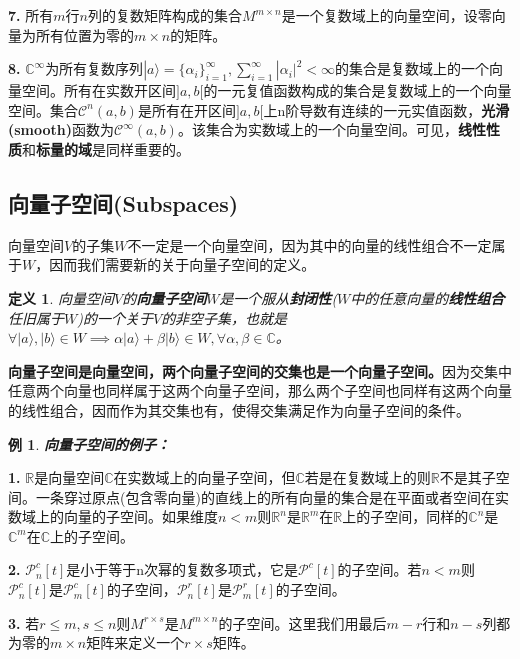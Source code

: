\documentclass[mathserif,hyperref,UTF8,openany,b5paper]{ctexbook}
\newtheorem{exmp}{例}[section]
\newtheorem{defn}{定义}[section]
\begin{document}
\textbf{7.}
所有$m$行$n$列的复数矩阵构成的集合$M^{m\times n}$是一个复数域上的向量空间，设零向量为所有位置为零的$m\times n$的矩阵。

\textbf{8.}
$\mathbb{C}^\infty$为所有复数序列$|a\rangle=\{\alpha_i\}^\infty_{i=1},\sum^\infty_{i=1}|\alpha_i|^2 < \infty$的集合是复数域上的一个向量空间。所有在实数开区间$]a,b[$的一元复值函数构成的集合是复数域上的一个向量空间。集合$\mathcal{C}^n(a,b)$是所有在开区间$]a,b[$上n阶导数有连续的一元实值函数，\textbf{光滑(smooth)}函数为$\mathcal{C}^\infty(a,b)$。该集合为实数域上的一个向量空间。可见，\textbf{线性性质}和\textbf{标量的域}是同样重要的。
\subsection{向量子空间(Subspaces)}
向量空间$V$的子集$W$不一定是一个向量空间，因为其中的向量的线性组合不一定属于$W$，因而我们需要新的关于向量子空间的定义。
\begin{defn}
向量空间$V$的\textbf{向量子空间}$W$是一个服从\textbf{封闭性}($W$中的任意向量的\textbf{线性组合}任旧属于$W$)的一个关于$V$的非空子集，也就是
$\forall |a\rangle,|b\rangle \in W \implies \alpha|a\rangle+\beta|b\rangle \in W, \forall \alpha,\beta\in \mathbb{C}$。
\end{defn}

\textbf{向量子空间是向量空间，两个向量子空间的交集也是一个向量子空间。}因为交集中任意两个向量也同样属于这两个向量子空间，那么两个子空间也同样有这两个向量的线性组合，因而作为其交集也有，使得交集满足作为向量子空间的条件。

\begin{exmp}\textbf{向量子空间的例子：}\end{exmp}

\textbf{1.} $\mathbb{R}$是向量空间$\mathbb{C}$在实数域上的向量子空间，但$\mathbb{C}$若是在复数域上的则$\mathbb{R}$不是其子空间。一条穿过原点(包含零向量)的直线上的所有向量的集合是在平面或者空间在实数域上的向量的子空间。如果维度$n<m$则$\mathbb{R}^n$是$\mathbb{R}^m$在$\mathbb{R}$上的子空间，同样的$\mathbb{C}^n$是$\mathbb{C}^m$在$\mathbb{C}$上的子空间。

 \textbf{2.} $\mathcal{P}^c_n [t]$是小于等于n次幂的复数多项式，它是$\mathcal{P}^c [t]$的子空间。若$n<m$则$\mathcal{P}^c_n [t]$是$\mathcal{P}^c _m[t]$的子空间，$\mathcal{P}^r_n [t]$是$\mathcal{P}^r_m [t]$的子空间。

 \textbf{3.} 若$r\leq m,s\leq n$则$M^{r\times s}$是$M^{m\times n}$的子空间。这里我们用最后$m - r$行和$n - s$列都为零的$m × n$矩阵来定义一个$r × s$矩阵。
\end{document}
